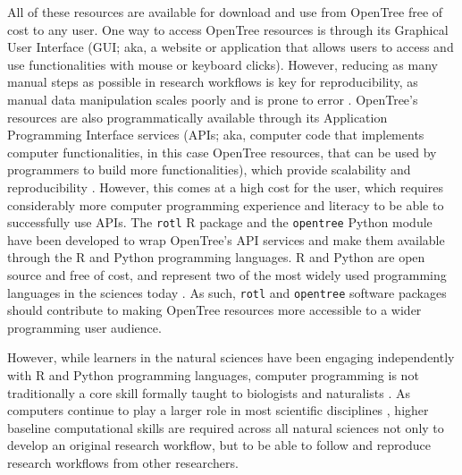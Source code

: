 \documentclass[12pt]{article}
\begin{document}
All of these resources
are available for download and use from OpenTree free of cost to any user.
One way to access OpenTree resources is through its Graphical User Interface (GUI; aka, a website or application that allows users to access and use functionalities with mouse or keyboard clicks).
However, reducing as many manual steps as possible in research workflows is key for reproducibility, as manual data manipulation scales poorly and is prone to error \citep{bakken2019journey}.
OpenTree's resources are also programmatically available through its Application Programming Interface services (APIs; aka, computer code that implements computer functionalities, in this case OpenTree resources, that can be used by programmers
to build more functionalities), which provide scalability and reproducibility \citep{opentreeAPIv3}.
However, this comes at a high cost for the user, which requires considerably more computer programming experience and literacy to be able to successfully use APIs.
The \texttt{rotl} R package \citep{michonneau2016rotl} and the \texttt{opentree} Python module \citep{mctavish2021opentree} have been developed to wrap OpenTree's API services
and make them available through the R and Python programming languages.
R and Python are open source and free of cost, and represent two of the most widely used programming languages in the sciences today \citep{eglen2009quick, baker2017scientific}.
As such, \texttt{rotl} and \texttt{opentree} software packages should contribute to making OpenTree resources more accessible to a wider programming user audience.

However, while learners in the natural sciences have been engaging independently with R and Python programming languages, computer programming is not traditionally a core skill formally taught to biologists and naturalists \citep{sayres2018bioinformatics, wright2019the, williams2019barriers}.
As computers continue to play a larger role in most scientific disciplines \citep{piccolo2016tools}, higher baseline computational skills are required across all natural sciences not only to develop an original research workflow, but to be able to follow and reproduce research workflows from other researchers.
\end{document}
